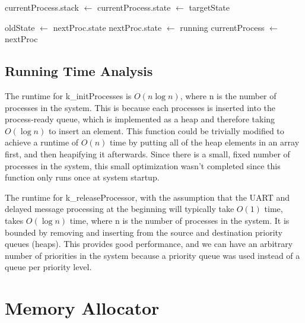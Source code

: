 \documentclass[12pt]{report}
\begin{document}
\begin{algorithm}
    \begin{algorithmic}[1]

            \State currentProcess.stack $\gets$ 
            \State currentProcess.state $\gets$ targetState
                \State {}
            \EndIf
        \EndIf

        \State oldState $\gets$ nextProc.state
        \State nextProc.state $\gets$ running
        \State currentProcess $\gets$ nextProc
        \State {}
             
        \EndIf
    \EndFunction
    \end{algorithmic}
\end{algorithm}

\section{Running Time Analysis}

    The runtime for k\_initProcesses is $O(n\log n)$, where n is the number of
    processes in the system. This is because each processes is inserted into the
    process-ready queue, which is implemented as a heap and therefore taking
    $O(\log n)$ to insert an element. This function could be trivially modified
    to achieve a runtime of $O(n)$ time by putting all of the heap elements in
    an array first, and then heapifying it afterwards. Since there is a
    small, fixed number of processes in the system, this small optimization
    wasn't completed since this function only runs once at system startup.

    The runtime for k\_releaseProcessor, with the assumption that the UART and
    delayed message processing at the beginning will typically take $O(1)$ time,
    takes $O(\log n)$ time, where n is the number of processes in the system. It
    is bounded by removing and inserting from the source and destination
    priority queues (heaps). This provides good performance, and we can have an
    arbitrary number of priorities in the system because a priority queue was
    used instead of a queue per priority level.

\chapter{Memory Allocator}
\end{document}
